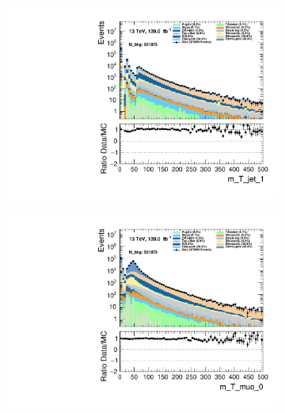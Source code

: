 \begin{figure}
    \centering
    \begin{subfigure}{.49\textwidth}
        \includegraphics[width=\textwidth]{Figures/MC_Data_comp/m_T_jet_1.pdf}
        \caption{}
        \label{fig:et}
    \end{subfigure}
    \hfill
    \begin{subfigure}{.49\textwidth}
        \includegraphics[width=\textwidth]{Figures/MC_Data_comp/m_T_muo_0.pdf}
        \caption{ }
        \label{fig:flcp}
    \end{subfigure}
    \hfill 
    \begin{subfigure}{.49\textwidth}

\end{subfigure}
\end{figure}
